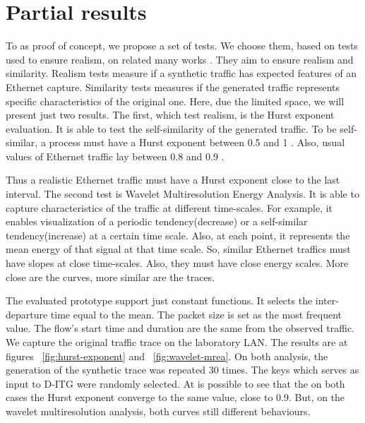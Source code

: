 
\section{Partial results}
\label{sec:partial-results}

To as proof of concept, we propose a set of tests. We choose them, based on tests used to ensure realism, on related many works \cite{sourcesOnOff-paper} \cite{swing-paper} \cite{legotg-paper}. They aim to ensure realism and similarity. Realism tests measure if a synthetic traffic has expected features of an Ethernet capture. Similarity tests measures if the generated traffic represents specific characteristics of the original one. Here, due the limited space, we will present just two results. The first, which test realism, is the Hurst exponent evaluation. It is able to test the self-similarity of the generated traffic. To be self-similar, a process must have a Hurst exponent between 0.5 and 1 \cite{selfsimilar-ethernet}. Also, usual values of Ethernet traffic lay between 0.8 and 0.9 \cite{selfsimilar-ethernet}.  




Thus a realistic Ethernet traffic must have a Hurst exponent close to the last interval. The second test is Wavelet Multiresolution Energy Analysis. It is able to capture characteristics of the traffic at different time-scales. For example, it enables  visualization of a periodic tendency(decrease) or a self-similar tendency(increase) at a certain time scale. Also, at each point, it represents the mean energy of that signal at that time scale. So, similar Ethernet traffics must have slopes at close time-scales. Also, they must have close energy scales. More close are the curves, more similar are the traces.

The evaluated prototype support just constant functions. It selects the inter-departure time equal to the mean. The packet size is set as the most frequent value. The flow's start time and duration are the same from the observed traffic. We capture the original traffic trace on the laboratory LAN. The results are at figures ~\ref{fig:hurst-exponent} and ~\ref{fig:wavelet-mrea}. On both analysis, the generation of the synthetic trace was repeated 30 times. The keys which serves as input to D-ITG were randomly selected. At  is possible to see that the on both cases the Hurst exponent converge to the same value, close to 0.9. But, on the wavelet multiresolution analysis, both curves still different behaviours.   

